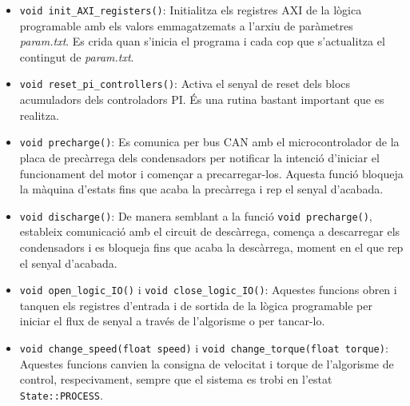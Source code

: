 {{{\begin{itemize}
                \item \lstinline{void init_AXI_registers()}:
                    Initialitza els registres AXI de la lògica programable amb
                    els valors emmagatzemats a l'arxiu de paràmetres
                    \emph{param.txt}. Es crida quan s'inicia el programa i cada
                    cop que s'actualitza el contingut de \emph{param.txt}.

                \item \lstinline{void reset_pi_controllers()}:
                    Activa el senyal de reset dels blocs acumuladors dels
                    controladors PI. És una rutina bastant important que es
                    realitza.

                \item \lstinline{void precharge()}: 
                    Es comunica per bus CAN amb el microcontrolador de la placa
                    de precàrrega dels condensadors per notificar la intenció
                    d'iniciar el funcionament del motor i començar a
                    precarregar-los. Aquesta funció bloqueja la màquina
                    d'estats fins que acaba la precàrrega i rep el senyal
                    d'acabada.

                \item \lstinline{void discharge()}:
                    De manera semblant a la funció \lstinline{void precharge()}, estableix
                    comunicació amb el circuit de descàrrega, comença a
                    descarregar els condensadors i es bloqueja fins que acaba
                    la descàrrega, moment en el que rep el senyal d'acabada.

                \item \lstinline{void open_logic_IO()} i \lstinline{void close_logic_IO()}:
                    Aquestes funcions obren i tanquen els registres d'entrada i
                    de sortida de la lògica programable per iniciar el flux de
                    senyal a través de l'algorisme o per tancar-lo.
                    
                \item \lstinline{void change_speed(float speed)} i \lstinline{void change_torque(float torque)}:
                    Aquestes funcions canvien la consigna de velocitat i torque
                    de l'algorisme de control, respecivament, sempre que el
                    sistema es trobi en l'estat \lstinline{State::PROCESS}.


\end{itemize}}}}
